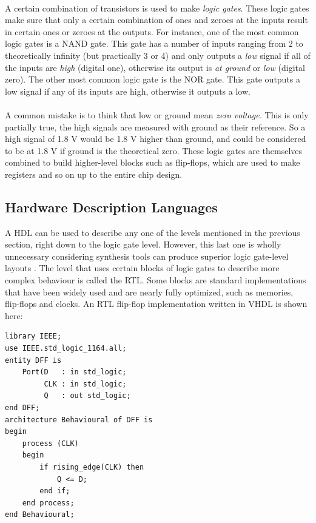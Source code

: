 \documentclass[11pt,british]{article}
\begin{document}
\\
A certain combination of transistors is used to make \emph{logic gates}. These logic gates make sure that only a certain combination of ones and zeroes at the inputs result in certain ones or zeroes at the outputs. For instance, one of the most common logic gates is a \gls{NAND} gate. This gate has a number of inputs ranging from 2 to theoretically infinity (but practically 3 or 4) and only outputs a \emph{low} signal if all of the inputs are \emph{high} (digital one), otherwise its output is \emph{at ground} or \emph{low} (digital zero). The other most common logic gate is the \gls{NOR} gate. This gate outputs a low signal if any of its inputs are high, otherwise it outputs a low.
\\
\\
A common mistake is to think that low or ground mean \emph{zero voltage.} This is only partially true, the high signals are measured with ground as their reference. So a high signal of 1.8 V would be 1.8 V higher than ground, and could be considered to be at 1.8 V if ground is the theoretical zero. These logic gates are themselves combined to build higher-level blocks such as flip-flops, which are used to make registers and so on up to the entire chip design.

\pagebreak

\subsection{Hardware Description Languages}

A \gls{HDL} can be used to describe any one of the levels mentioned in the previous section, right down to the logic gate level. However, this last one is wholly unnecessary considering synthesis tools can produce superior logic gate-level layouts \cite{VHDLintro}. The level that uses certain blocks of logic gates to describe more complex behaviour is called the \gls{RTL}. Some blocks are standard implementations that have been widely used and are nearly fully optimized, such as memories, flip-flops and clocks. An \gls{RTL} flip-flop implementation written in \gls{VHDL} is shown here: 
\begin{lstlisting}[tabsize=4, frame=single, framesep=2mm, belowskip=16pt, aboveskip=16pt]
library IEEE;
use IEEE.std_logic_1164.all;
entity DFF is
	Port(D 	 : in std_logic;
		 CLK : in std_logic;
		 Q 	 : out std_logic;
end DFF;
architecture Behavioural of DFF is
begin
	process (CLK)
	begin
		if rising_edge(CLK) then
			Q <= D;
		end if;
	end process;
end Behavioural;
\end{lstlisting}
\end{document}
